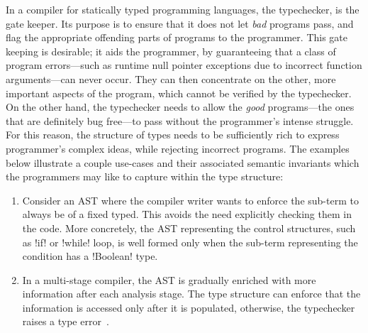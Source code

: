 \documentclass[screen,nonacm,manuscript,review]{acmart} %
\begin{document}
In a compiler for statically typed programming languages, the
typechecker, is the gate keeper. Its purpose is to ensure that it does
not let \emph{bad} programs pass, and flag the appropriate offending
parts of programs to the programmer. This gate keeping is desirable;
it aids the programmer, by guaranteeing that a class of program
errors---such as runtime null pointer exceptions due to incorrect
function arguments---can never occur. They can then concentrate on the
other, more important aspects of the program, which cannot be verified
by the typechecker. On the other hand, the typechecker needs to allow
the \emph{good} programs---the ones that are definitely bug free---to
pass without the programmer's intense struggle. For
this reason, the structure of types needs to be sufficiently rich
to express programmer's complex ideas, while rejecting incorrect
programs. The examples below illustrate a couple use-cases and
their associated semantic invariants which the programmers may like to
capture within the type structure:
\begin{enumerate}
\item Consider an AST where the compiler writer wants to enforce the
  sub-term to always be of a fixed typed. This avoids the need
  explicitly checking them in the code.
  More concretely, the AST representing the control structures, such
  as !if! or !while! loop, is well formed only when the sub-term
  representing the condition has a !Boolean! type.
\item In a multi-stage compiler, the AST is gradually enriched with
  more information after each analysis stage. The type structure can
  enforce that the information is accessed only after it is populated,
  otherwise, the typechecker raises a type
  error~\cite{peyton_jones_trees_2017}.
\end{enumerate}
\end{document}
